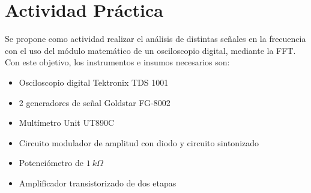   \pagebreak
  \section{Actividad Práctica}
    Se propone como actividad realizar el análisis de distintas señales en la frecuencia con el uso del
    módulo matemático de un osciloscopio digital, mediante la FFT. Con este objetivo, los instrumentos
    e insumos necesarios son:

    \begin{itemize}
      \item Osciloscopio digital Tektronix TDS 1001
      \item 2 generadores de señal Goldstar FG-8002
      \item Multímetro Unit UT890C
      \item Circuito modulador de amplitud con diodo y circuito sintonizado
      \item Potenciómetro de $1~k\Omega$
      \item Amplificador transistorizado de dos etapas
    \end{itemize}

    
    
    
    
    
    
    
